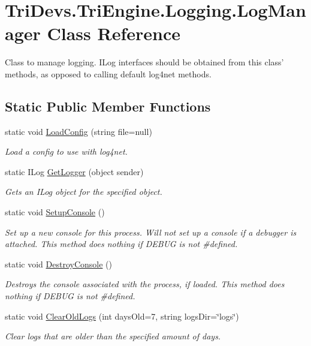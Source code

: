 \hypertarget{class_tri_devs_1_1_tri_engine_1_1_logging_1_1_log_manager}{\section{Tri\-Devs.\-Tri\-Engine.\-Logging.\-Log\-Manager Class Reference}
\label{class_tri_devs_1_1_tri_engine_1_1_logging_1_1_log_manager}
}


Class to manage logging. I\-Log interfaces should be obtained from this class' methods, as opposed to calling default log4net methods.  


\subsection*{Static Public Member Functions}
\begin{DoxyCompactItemize}
\item 
static void \hyperlink{class_tri_devs_1_1_tri_engine_1_1_logging_1_1_log_manager_ae2ba7567853910a23da627a677d23785}{Load\-Config} (string file=null)
\begin{DoxyCompactList}\small\item\em Load a config to use with log4net. \end{DoxyCompactList}\item 
static I\-Log \hyperlink{class_tri_devs_1_1_tri_engine_1_1_logging_1_1_log_manager_a19952b119ef4579d02616e78577dd5be}{Get\-Logger} (object sender)
\begin{DoxyCompactList}\small\item\em Gets an I\-Log object for the specified object. \end{DoxyCompactList}\item 
static void \hyperlink{class_tri_devs_1_1_tri_engine_1_1_logging_1_1_log_manager_abbc077826cba4e1ab1ca47c53ab74fc0}{Setup\-Console} ()
\begin{DoxyCompactList}\small\item\em Set up a new console for this process. Will not set up a console if a debugger is attached. This method does nothing if D\-E\-B\-U\-G is not \#defined. \end{DoxyCompactList}\item 
static void \hyperlink{class_tri_devs_1_1_tri_engine_1_1_logging_1_1_log_manager_a5511d68a53c847514ac33b6f73d038b0}{Destroy\-Console} ()
\begin{DoxyCompactList}\small\item\em Destroys the console associated with the process, if loaded. This method does nothing if D\-E\-B\-U\-G is not \#defined. \end{DoxyCompactList}\item 
static void \hyperlink{class_tri_devs_1_1_tri_engine_1_1_logging_1_1_log_manager_a138b84f591d5fd6c556fa8102749166b}{Clear\-Old\-Logs} (int days\-Old=7, string logs\-Dir=\char`\"{}logs\char`\"{})
\begin{DoxyCompactList}\small\item\em Clear logs that are older than the specified amount of days. \end{DoxyCompactList}\end{DoxyCompactItemize}


